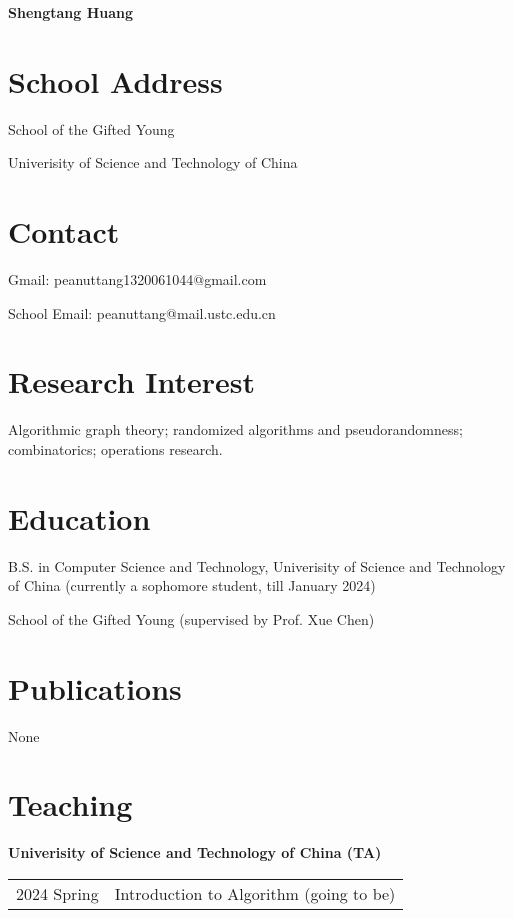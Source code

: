 \documentclass[12pt,a4paper,oneside]{ctexart}
\begin{document}
\begin{center}
    \Large \textbf{Shengtang Huang}
\end{center}

\section*{School Address}

\footnotesize

School of the Gifted Young

Univerisity of Science and Technology of China

\section*{Contact}

Gmail: peanuttang1320061044@gmail.com

School Email: peanuttang@mail.ustc.edu.cn

\section*{Research Interest}

Algorithmic graph theory; randomized algorithms and pseudorandomness; combinatorics; operations research.

\section*{Education}

B.S. in Computer Science and Technology, Univerisity of Science and Technology of China (currently a sophomore student, till January 2024)

School of the Gifted Young (supervised by Prof. Xue Chen)

\section*{Publications}

None

\section*{Teaching}

\textbf{Univerisity of Science and Technology of China (TA)}

\begin{tabular}{ll}
    2024 Spring & Introduction to Algorithm (going to be)
\end{tabular}
\end{document}
